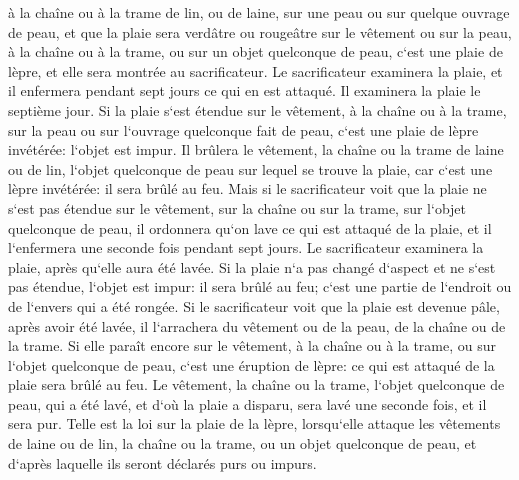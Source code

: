 \verse à la chaîne ou à la trame de lin, ou de laine, sur une peau ou sur quelque ouvrage de peau, 
\verse et que la plaie sera verdâtre ou rougeâtre sur le vêtement ou sur la peau, à la chaîne ou à la trame, ou sur un objet quelconque de peau, c`est une plaie de lèpre, et elle sera montrée au sacrificateur. 
\verse Le sacrificateur examinera la plaie, et il enfermera pendant sept jours ce qui en est attaqué. 
\verse Il examinera la plaie le septième jour. Si la plaie s`est étendue sur le vêtement, à la chaîne ou à la trame, sur la peau ou sur l`ouvrage quelconque fait de peau, c`est une plaie de lèpre invétérée: l`objet est impur. 
\verse Il brûlera le vêtement, la chaîne ou la trame de laine ou de lin, l`objet quelconque de peau sur lequel se trouve la plaie, car c`est une lèpre invétérée: il sera brûlé au feu. 
\verse Mais si le sacrificateur voit que la plaie ne s`est pas étendue sur le vêtement, sur la chaîne ou sur la trame, sur l`objet quelconque de peau, 
\verse il ordonnera qu`on lave ce qui est attaqué de la plaie, et il l`enfermera une seconde fois pendant sept jours. 
\verse Le sacrificateur examinera la plaie, après qu`elle aura été lavée. Si la plaie n`a pas changé d`aspect et ne s`est pas étendue, l`objet est impur: il sera brûlé au feu; c`est une partie de l`endroit ou de l`envers qui a été rongée. 
\verse Si le sacrificateur voit que la plaie est devenue pâle, après avoir été lavée, il l`arrachera du vêtement ou de la peau, de la chaîne ou de la trame. 
\verse Si elle paraît encore sur le vêtement, à la chaîne ou à la trame, ou sur l`objet quelconque de peau, c`est une éruption de lèpre: ce qui est attaqué de la plaie sera brûlé au feu. 
\verse Le vêtement, la chaîne ou la trame, l`objet quelconque de peau, qui a été lavé, et d`où la plaie a disparu, sera lavé une seconde fois, et il sera pur. 
\verse Telle est la loi sur la plaie de la lèpre, lorsqu`elle attaque les vêtements de laine ou de lin, la chaîne ou la trame, ou un objet quelconque de peau, et d`après laquelle ils seront déclarés purs ou impurs. 


